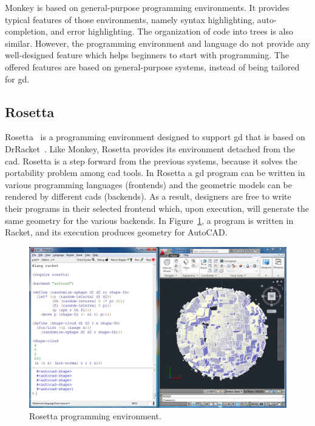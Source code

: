 Monkey is based on general-purpose programming environments. It provides typical features of those environments, namely syntax highlighting, auto-completion, and error highlighting. The organization of code into trees is also similar. However, the programming environment and language do not provide any well-designed feature which helps beginners to start with programming. The offered features are based on general-purpose systems, instead of being tailored for \gls{gd}.
\subsection{Rosetta}
\label{subsec:rosetta}
Rosetta~\citep{lopes2011portable} is a programming environment designed to support \gls{gd} that is based on DrRacket~\citep{findler2002drscheme}. Like Monkey, Rosetta provides its environment detached from the \gls{cad}. Rosetta is a step forward from the previous systems, because it solves the portability problem among \gls{cad} tools. In Rosetta a \gls{gd} program can be written in various programming languages (frontends) and the geometric models can be rendered by different \glspl{cad} (backends). As a result, designers are free to write their programs in their selected frontend which, upon execution, will generate the same geometry for the various backends. In Figure~\ref{fig:rosetta}, a program is written in Racket, and its execution produces geometry for AutoCAD.

\begin{figure}[!htbp]
  \centering
  \includegraphics[width=1.0\textwidth]{images/rosetta1}
    \caption{Rosetta programming environment.}  
  \label{fig:rosetta}
\end{figure} 

